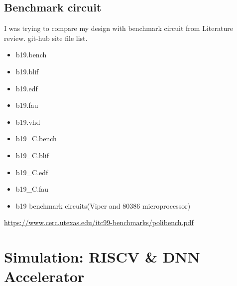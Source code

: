 \documentclass[a4paper]{article}
\begin{document}
\subsection{Benchmark circuit}
\label{sec:orgc768bba}
I was trying to compare my design with benchmark circuit from Literature review. git-hub site file list.
\begin{itemize}
\item b19.bench
\item b19.blif
\item b19.edf
\item b19.fau
\item b19.vhd
\item b19\_C.bench
\item b19\_C.blif
\item b19\_C.edf
\item b19\_C.fau

\item b19 benchmark circuits(Viper and 80386 microprocessor)
\end{itemize}
\url{https://www.cerc.utexas.edu/itc99-benchmarks/polibench.pdf}

\section{Simulation: RISCV \& DNN Accelerator}
\label{sec:orgabfb093}
\end{document}
